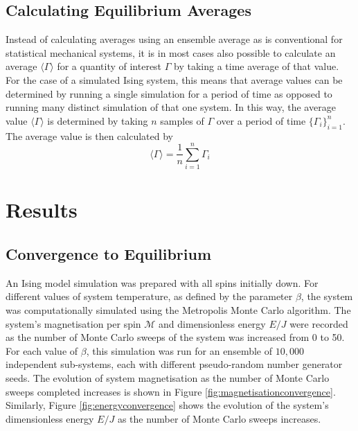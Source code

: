 \documentclass[11pt]{iopart}
\begin{document}
\subsection{Calculating Equilibrium Averages}

Instead of calculating averages using an ensemble average as is conventional for statistical mechanical systems, it is in most cases also possible to calculate an average $\langle \Gamma \rangle$ for a quantity of interest $\Gamma$ by taking a time average of that value. For the case of a simulated Ising system, this means that average values can be determined by running a single simulation for a period of time as opposed to running many distinct simulation of that one system. In this way, the average value $\langle \Gamma \rangle$ is determined by taking $n$ samples of $\Gamma$ over a period of time $\{ \Gamma_i \}_{i=1}^{n}$. The average value is then calculated by
\begin{equation}
\langle \Gamma \rangle = \frac{1}{n}\sum_{i=1}^{n} \Gamma_i
\end{equation}

\section{Results}

\subsection{Convergence to Equilibrium}

An Ising model simulation was prepared with all spins initially down. For different values of system temperature, as defined by the parameter $\beta$, the system was computationally simulated using the Metropolis Monte Carlo algorithm. The system's magnetisation per spin $\mathcal{M}$ and dimensionless energy $E/J$ were recorded as the number of Monte Carlo sweeps of the system was increased from 0 to 50. For each value of $\beta$, this simulation was run for an ensemble of $10,000$ independent sub-systems, each with different pseudo-random number generator seeds. The evolution of system magnetisation as the number of Monte Carlo sweeps completed increases is shown in Figure \ref{fig:magnetisationconvergence}. Similarly, Figure \ref{fig:energyconvergence} shows the evolution of the system's dimensionless energy $E/J$ as the number of Monte Carlo sweeps increases.
\end{document}

